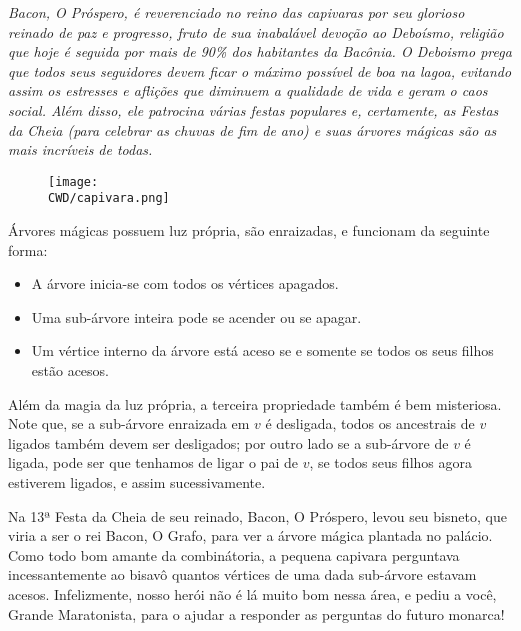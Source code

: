 %

\begin{center}
\textit{Bacon, O Próspero, é reverenciado no reino das capivaras por seu glorioso reinado de paz e progresso, fruto de sua inabalável devoção ao Deboísmo,
religião que hoje é seguida por mais de 90\% dos habitantes da Bacônia. O Deboismo prega que todos seus seguidores devem ficar o máximo possível
de boa na lagoa, evitando assim os estresses e aflições que diminuem a qualidade de vida e geram o caos social. Além disso, ele patrocina várias festas
populares e, certamente, as Festas da Cheia (para celebrar as chuvas de fim de ano) e suas árvores mágicas são as mais incríveis de todas.}
\end{center}

\begin{figure}[H]
  \centering
  \texttt{[image: \\CWD/capivara.png]}
\end{figure}

Árvores mágicas possuem luz própria, são enraizadas, e funcionam da seguinte forma:

\begin{itemize}
	\item A árvore inicia-se com todos os vértices apagados.
	\item Uma sub-árvore inteira pode se acender ou se apagar.
	\item Um vértice interno da árvore está aceso se e somente se todos os seus filhos estão acesos.
\end{itemize}

Além da magia da luz própria, a terceira propriedade também é bem misteriosa. Note que, se a sub-árvore enraizada em $v$ é desligada,
todos os ancestrais de $v$ ligados também devem ser desligados; por outro lado se a sub-árvore de $v$ é ligada, pode ser que tenhamos de ligar o pai de $v$,
se todos seus filhos agora estiverem ligados, e assim sucessivamente.

Na 13ª Festa da Cheia de seu reinado, Bacon, O Próspero, levou seu bisneto, que viria a ser o rei Bacon, O Grafo, para ver a árvore mágica plantada
no palácio. Como todo bom amante da combinátoria, a pequena capivara perguntava incessantemente ao bisavô quantos vértices de uma dada sub-árvore estavam acesos.
Infelizmente, nosso herói não é lá muito bom nessa área, e pediu a você, Grande Maratonista, para o ajudar a responder as perguntas do futuro monarca!

